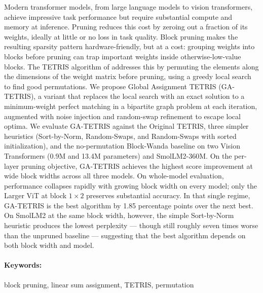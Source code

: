 \documentclass[12pt, twoside]{book}
\begin{document}
Modern transformer models, from large language models to vision transformers, achieve impressive task performance but require substantial compute and memory at inference. Pruning reduces this cost by zeroing out a fraction of its weights, ideally at little or no loss in task quality. Block pruning makes the resulting sparsity pattern hardware-friendly, but at a cost: grouping weights into blocks before pruning can trap important weights inside otherwise-low-value blocks. The TETRIS algorithm of \cite{tetris} addresses this by permuting the elements along the dimensions of the weight matrix before pruning, using a greedy local search to find good permutations. We propose Global Assignment TETRIS (GA-TETRIS), a variant that replaces the local search with an exact solution to a minimum-weight perfect matching in a bipartite graph problem at each iteration, augmented with noise injection and random-swap refinement to escape local optima. We evaluate GA-TETRIS against the Original TETRIS, three simpler heuristics (Sort-by-Norm, Random-Swaps, and Random-Swaps with sorted initialization), and the no-permutation Block-Wanda baseline on two Vision Transformers (0.9M and 13.4M parameters) and SmolLM2-360M. On the per-layer pruning objective, GA-TETRIS achieves the highest score improvement at wide block widths across all three models. On whole-model evaluation, performance collapses rapidly with growing block width on every model; only the Larger ViT at block $1 \times 2$ preserves substantial accuracy. In that single regime, GA-TETRIS is the best algorithm by 1.85 percentage points over the next best. On SmolLM2 at the same block width, however, the simple Sort-by-Norm heuristic produces the lowest perplexity — though still roughly seven times worse than the unpruned baseline — suggesting that the best algorithm depends on both block width and model.


\paragraph*{Keywords:} block pruning, linear sum assignment, TETRIS, permutation


%
%
%
%
\end{document}
